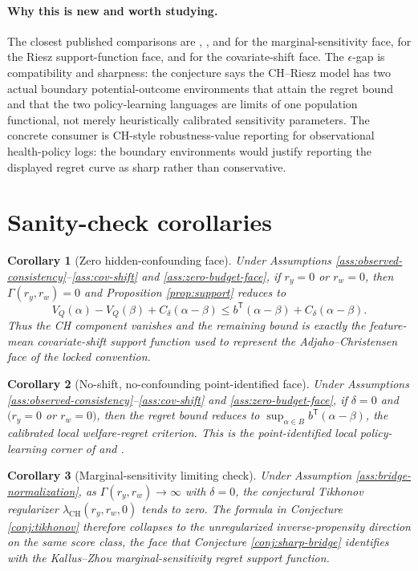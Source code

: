 \documentclass[11pt]{article}
\newcommand{\transpose}{\mathsf{T}}
\theoremstyle{definition}
\theoremstyle{plain}
\newtheorem{corollary}{Corollary}
\theoremstyle{remark}
\begin{document}
\paragraph{Why this is new and worth studying.}
The closest published comparisons are \citet{Tan2006}, \citet{ZhaoSmallBhattacharya2019}, and \citet{KallusZhou2021} for the marginal-sensitivity face, \citet{ChernozhukovCinelliNeweySharmaSyrgkanis2022} for the Riesz support-function face, and \citet{AdjahoChristensen2025} for the covariate-shift face. The $\epsilon$-gap is compatibility and sharpness: the conjecture says the CH--Riesz model has two actual boundary potential-outcome environments that attain the regret bound and that the two policy-learning languages are limits of one population functional, not merely heuristically calibrated sensitivity parameters. The concrete consumer is CH-style robustness-value reporting for observational health-policy logs: the boundary environments would justify reporting the displayed regret curve as sharp rather than conservative.

\section{Sanity-check corollaries}
\begin{corollary}[Zero hidden-confounding face]\label{cor:zero}
Under Assumptions \ref{ass:observed-consistency}--\ref{ass:cov-shift} and \ref{ass:zero-budget-face}, if $r_y=0$ or $r_w=0$, then $\Gamma(r_y,r_w)=0$ and Proposition \ref{prop:support} reduces to
\[
  V_Q(\alpha)-V_Q(\beta)+C_\delta(\alpha-\beta)
  \le b^\transpose(\alpha-\beta)
  +C_\delta(\alpha-\beta).
\]
Thus the CH component vanishes and the remaining bound is exactly the feature-mean covariate-shift support function used to represent the Adjaho--Christensen face of the locked convention.
\end{corollary}

\begin{corollary}[No-shift, no-confounding point-identified face]\label{cor:point}
Under Assumptions \ref{ass:observed-consistency}--\ref{ass:cov-shift} and \ref{ass:zero-budget-face}, if $\delta=0$ and $(r_y=0$ or $r_w=0)$, then the regret bound reduces to
$\sup_{\alpha\in B} b^\transpose(\alpha-\beta)$, the calibrated local welfare-regret criterion. This is the point-identified local policy-learning corner of \citet{KitagawaTetenov2018} and \citet{AtheyWager2021}.
\end{corollary}

\begin{corollary}[Marginal-sensitivity limiting check]\label{cor:kz}
Under Assumption \ref{ass:bridge-normalization}, as $\Gamma(r_y,r_w)\to\infty$ with $\delta=0$, the conjectural Tikhonov regularizer $\lambda_{\mathrm{CH}}(r_y,r_w,0)$ tends to zero. The formula in Conjecture \ref{conj:tikhonov} therefore collapses to the unregularized inverse-propensity direction on the same score class, the face that Conjecture \ref{conj:sharp-bridge} identifies with the Kallus--Zhou marginal-sensitivity regret support function.
\end{corollary}
\end{document}

